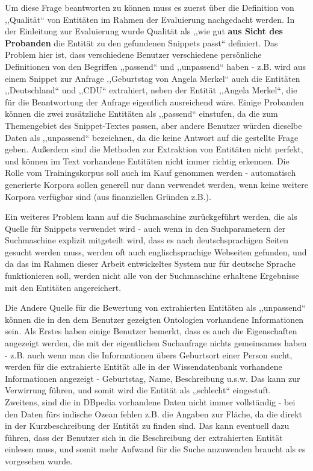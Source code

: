 Um diese Frage beantworten zu können muss es zuerst über die Definition von ,,Qualität`` von Entitäten im Rahmen der Evaluierung nachgedacht werden. In der Einleitung zur Evaluierung wurde Qualität als ,,wie gut \textbf{aus Sicht des Probanden} die Entität zu den gefundenen Snippets passt`` definiert. Das Problem hier ist, dass verschiedene Benutzer verschiedene persönliche Definitionen von den Begriffen ,,passend`` und ,,unpassend`` haben - z.B. wird aus einem Snippet zur Anfrage ,,Geburtstag von Angela Merkel`` auch die Entitäten ,,Deutschland`` und ,,CDU`` extrahiert, neben der Entität ,,Angela Merkel``, die für die Beantwortung der Anfrage eigentlich ausreichend wäre. Einige Probanden können die zwei zusätzliche Entitäten als ,,passend`` einstufen, da die zum Themengebiet des Snippet-Textes passen, aber andere Benutzer würden dieselbe Daten als ,,unpassend`` bezeichnen, da die keine Antwort auf die gestellte Frage geben. Außerdem sind die Methoden zur Extraktion von Entitäten nicht perfekt, und können im Text vorhandene Entitäten nicht immer richtig erkennen. Die Rolle vom Trainingskorpus soll auch im Kauf genommen werden - automatisch generierte Korpora sollen generell nur dann verwendet werden, wenn keine weitere Korpora verfügbar sind (aus finanziellen Gründen z.B.).

Ein weiteres Problem kann auf die Suchmaschine zurückgeführt werden, die als Quelle für Snippets verwendet wird - auch wenn in den Suchparametern der Suchmaschine explizit mitgeteilt wird, dass es nach deutschsprachigen Seiten gesucht werden muss, werden oft auch englischsprachige Webseiten gefunden, und da das im Rahmen dieser Arbeit entwickeltes System nur für deutsche Sprache funktionieren soll, werden nicht alle von der Suchmaschine erhaltene Ergebnisse mit den Entitäten angereichert.

Die Andere Quelle für die Bewertung von extrahierten Entitäten als ,,unpassend`` können die in den dem Benutzer gezeigten Ontologien vorhandene Informationen sein. Als Erstes haben einige Benutzer bemerkt, dass es auch die Eigenschaften angezeigt werden, die mit der eigentlichen Suchanfrage nichts gemeinsames haben - z.B. auch wenn man die Informationen übers Geburtsort einer Person sucht, werden für die extrahierte Entität alle in der Wissendatenbank vorhandene Informationen angezeigt - Geburtstag, Name, Beschreibung u.s.w. Das kann zur Verwirrung führen, und somit wird die Entität als ,,schlecht`` eingestuft. Zweitens, sind die in DBpedia vorhandene Daten nicht immer vollständig - bei den Daten fürs indische Ozean fehlen z.B. die Angaben zur Fläche, da die direkt in der Kurzbeschreibung der Entität zu finden sind. Das kann eventuell dazu führen, dass der Benutzer sich in die Beschreibung der extrahierten Entität einlesen muss, und somit mehr Aufwand für die Suche anzuwenden braucht als es vorgesehen wurde. 

